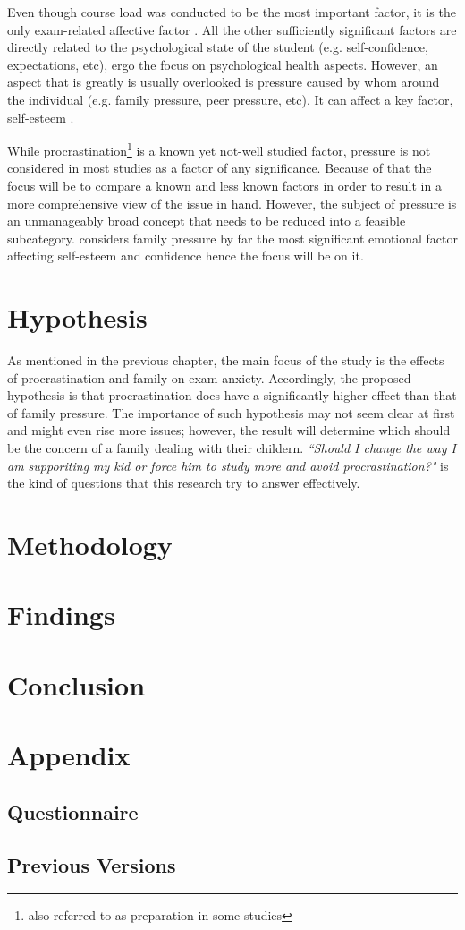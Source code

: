 \documentclass[12pt]{report}
\begin{document}
Even though course load was conducted to be the most important factor, it is the
only exam-related affective factor \parencite{hashmat2008factors}. All the other
sufficiently significant factors are directly related to the psychological state
of the student (e.g. self-confidence, expectations, etc), ergo the focus on
psychological health aspects. However, an aspect that is greatly is usually
overlooked is pressure caused by whom around the individual (e.g. family
pressure, peer pressure, etc). It can affect a key factor, self-esteem
\parencite{whitbeck1991family}.

While procrastination\footnote{also referred to as preparation in some studies}
is a known yet not-well studied factor, pressure is not considered in most
studies as a factor of any significance. Because of that the focus will be to
compare a known and less known factors in order to result in a more
comprehensive view of the issue in hand. However, the subject of pressure is an
unmanageably broad concept that needs to be reduced into a feasible subcategory.
\cite{whitbeck1991family} considers family pressure by far the most significant
emotional factor affecting self-esteem and confidence hence the focus will be on
it.

\chapter{Hypothesis}

As mentioned in the previous chapter, the main focus of the study is the effects
of procrastination and family on exam anxiety. Accordingly, the proposed
hypothesis is that procrastination does have a significantly higher effect than
that of family pressure. The importance of such hypothesis may not seem clear at
first and might even rise more issues; however, the result will determine which
should be the concern of a family dealing with their childern. \textit{``Should
I change the way I am supporiting my kid or force him to study more and avoid
procrastination?"} is the kind of questions that this research try to answer
effectively.

\chapter{Methodology}

\lipsum

\chapter{Findings}

\lipsum

\chapter{Conclusion}

\lipsum

\printbibliography[heading=bibnumbered]

\chapter{Appendix}

\section{Questionnaire}
\lipsum
\section{Previous Versions}
\lipsum
\end{document}
